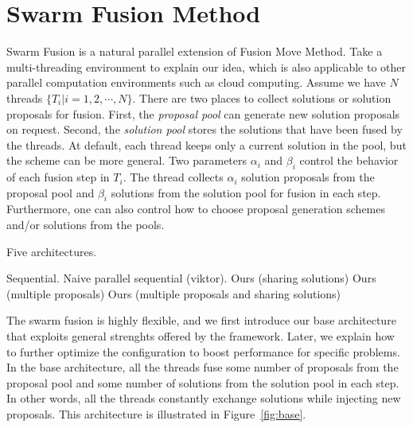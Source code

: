\section{Swarm Fusion Method}
  Swarm Fusion is a natural
parallel extension of Fusion Move Method. Take a multi-threading
environment to explain our idea, which is also applicable to other
parallel computation environments such as cloud computing. Assume we
have $N$ threads $\{T_i | i=1, 2, \cdots, N\}$. There are two places to
collect solutions or solution proposals for fusion. First, the {\it
proposal pool} can generate new solution proposals on request.
%
Second, the {\it solution pool} stores the solutions that have been
fused by the threads. At default, each thread keeps only a current
solution in the pool, but the scheme can be more general. Two
parameters $\alpha_i$ and $\beta_i$ control the behavior of each fusion
step in $T_i$. The thread collects $\alpha_i$ solution proposals
from the proposal pool and $\beta_i$ solutions from the solution pool
for fusion in each step.
%
Furthermore, one can also control how to choose proposal generation
schemes and/or solutions from the pools.



Five architectures.

Sequential.
Naive parallel sequential (viktor).
Ours (sharing solutions)
Ours (multiple proposals)
Ours (multiple proposals and sharing solutions)





The swarm fusion is highly flexible, and we first introduce our base
architecture that exploits general strenghts offered by the
framework. Later, we explain how to further optimize the configuration
to boost performance for specific problems. In the base architecture,
all the threads fuse some number of proposals from the proposal pool and
some number of solutions from the solution pool in each step. In other
words, all the threads constantly exchange solutions while injecting new
proposals. This architecture is illustrated in Figure~\ref{fig:base}.

